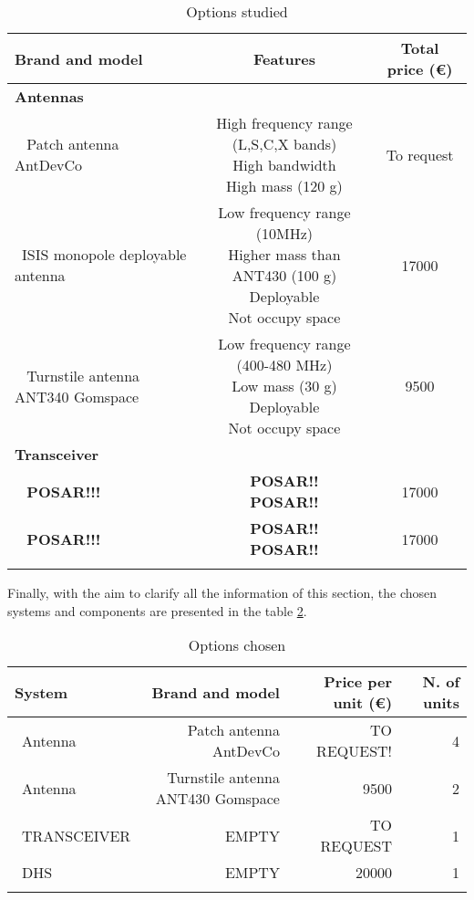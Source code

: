 \begin{longtable}{| l | c | c | }
\hline
\rowcolor[gray]{0.80}	\textbf{Brand and model} &  \textbf{Features}     & \textbf{Total price (\euro)}   \\
\hline
\endfirsthead

\rowcolor[gray]{0.85} \textbf{Antennas} &  &  \\
	   ~	Patch antenna AntDevCo & \makecell{High frequency range (L,S,C,X bands)\\ High bandwidth \\High mass (120 g)} & To request \\
	   \hline
	  ~ISIS monopole deployable antenna & \makecell{Low frequency range (10MHz) \\ Higher mass than ANT430 (100 g) \\ Deployable \\ Not occupy space} & 17000 \\
	   \hline
	  ~	Turnstile antenna ANT340 Gomspace & \makecell{Low frequency range (400-480 MHz) \\ Low mass (30 g) \\ Deployable \\ Not occupy space} & 9500 \\
	   \hline
	\hline

\rowcolor[gray]{0.85} \textbf{Transceiver} &  &  \\
	   ~	\textbf{POSAR!!!} & \makecell{\textbf{POSAR!!}\\ \textbf{POSAR!!}} & 17000 \\
	   \hline
	   ~	\textbf{POSAR!!!} & \makecell{\textbf{POSAR!!}\\ \textbf{POSAR!!}} & 17000 \\
	   \hline
	\hline
	
\caption{Options studied}
\label{payloadoptions}
\end{longtable}

Finally, with the aim to clarify all the information of this section, the chosen systems and components are presented in the table \ref{payloadchosen}.

\begin{longtable}{| l | r | r | r |}
	\hline
	\rowcolor[gray]{0.80}	\textbf{System} &  \textbf{Brand and model}     & \textbf{Price per unit (\euro)} & \textbf{N. of units}  \\
	\hline
	\endfirsthead
	
	~Antenna & Patch antenna AntDevCo & TO REQUEST! & 4 \\
	~Antenna & Turnstile antenna ANT430 Gomspace & 9500 & 2 \\
	~TRANSCEIVER & EMPTY & TO REQUEST & 1 \\
	~DHS & EMPTY & 20000 & 1 \\
	\hline
	
\caption{Options chosen}
\label{payloadchosen}
\end{longtable}

